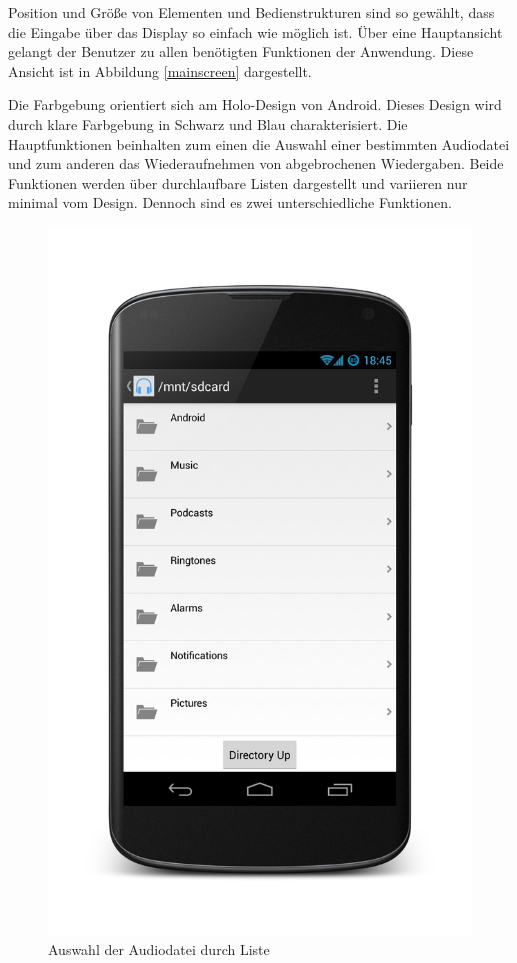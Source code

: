 Position und Größe von Elementen und Bedienstrukturen sind so gewählt, dass die Eingabe über das Display so einfach wie möglich ist. Über eine Hauptansicht gelangt der Benutzer zu allen benötigten Funktionen der Anwendung. Diese Ansicht ist in Abbildung \ref{mainscreen} dargestellt.

Die Farbgebung orientiert sich am Holo-Design von Android. Dieses Design wird durch klare Farbgebung in Schwarz und Blau charakterisiert. Die Hauptfunktionen beinhalten zum einen die Auswahl einer bestimmten Audiodatei und zum anderen das Wiederaufnehmen von abgebrochenen Wiedergaben. Beide Funktionen werden über durchlaufbare Listen dargestellt und variieren nur minimal vom Design. Dennoch sind es zwei unterschiedliche Funktionen.

\begin{figure}[h!t]
\begin{center}
\includegraphics[scale=.2]{images/browsing}
\caption{Auswahl der Audiodatei durch Liste}
\label{browsing}
\end{center}
\end{figure}

